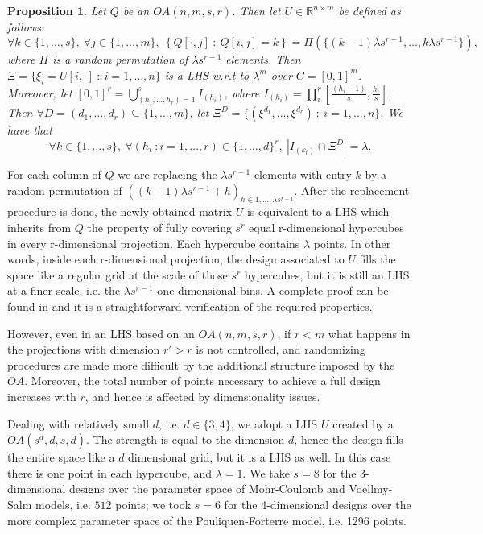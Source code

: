 \documentclass{article}
\newtheorem{proposition}[theorem]{Proposition}
\begin{document}
\begin{proposition}
Let $Q$ be an $OA(n,m,s,r)$. Then let $U\in\mathbb R^{n\times m}$ be defined as follows:
$$\forall k\in \{1,\dots,s\},\ \forall j\in \{1,\dots,m\},\ \left\{Q[\cdot,j]\ :\ Q[i,j]=k\right\} = \Pi\left(\{(k-1)\lambda s^{r-1},\dots, k\lambda s^{r-1}\}\right),$$
where $\Pi$ is a random permutation of $\lambda s^{r-1}$ elements. Then $\Xi=\{\xi_i=U[i,\cdot]\ :\ i=1,\dots,n\}$ is a LHS w.r.t to $\lambda^m$ over $C=[0,1]^m$. Moreover, let $[0,1]^r=\bigcup_{(h_1,\dots,h_r)=1}^{s} I_{(h_i)}$, where $I_{(h_i)}=\prod^r_i[\frac{(h_i-1)}{s},\frac{h_i}{s}]$. Then $\forall D=(d_1,\dots,d_r)\subseteq \{1,\dots,m\}$, let $\Xi^D=\{(\xi^{d_1},\dots,\xi^{d_r})\ :\ i=1,\dots,n\}$. We have that
$$\forall k\in \{1,\dots,s\},\ \forall (h_i\ : i=1,\dots,r)\in\{1,\dots,d\}^r,\ \left|I_{(k_i)}\cap\Xi^D\right|=\lambda.$$
\end{proposition}

For each column of $Q$ we are replacing the $\lambda s^{r-1}$ elements with entry $k$ by a random permutation of $\left((k-1)\lambda s^{r-1} + h\right)_{h\in 1,\dots, \lambda s^{r-1}}$. After the replacement procedure is done, the newly obtained matrix $U$ is equivalent to a LHS which inherits from $Q$ the property of fully covering $s^r$ equal r-dimensional hypercubes in every r-dimensional projection. Each hypercube contains $\lambda$ points. In other words, inside each r-dimensional projection, the design associated to $U$ fills the space like a regular grid at the scale of those $s^r$ hypercubes, but it is still an LHS at a finer scale, i.e. the $\lambda s^{r-1}$ one dimensional bins. A complete proof can be found in \citep{Tang1993} and it is a straightforward verification of the required properties.

However, even in an LHS based on an $OA(n,m,s,r)$, if $r<m$ what happens in the projections with dimension $r'>r$ is not controlled, and randomizing procedures are made more difficult by the additional structure imposed by the $OA$. Moreover, the total number of points necessary to achieve a full design increases with $r$, and hence is affected by dimensionality issues.

Dealing with relatively small $d$, i.e. $d\in\{3,4\}$, we adopt a LHS $U$ created by a $OA(s^d,d,s,d)$. The strength is equal to the dimension $d$, hence the design fills the entire space like a $d$ dimensional grid, but it is a LHS as well. In this case there is one point in each hypercube, and $\lambda=1$. We take $s=8$ for the 3-dimensional designs over the parameter space of Mohr-Coulomb and Voellmy-Salm models, i.e. $512$ points; we took $s=6$ for the 4-dimensional designs over the more complex parameter space of the Pouliquen-Forterre model, i.e. 1296 points.
\end{document}

